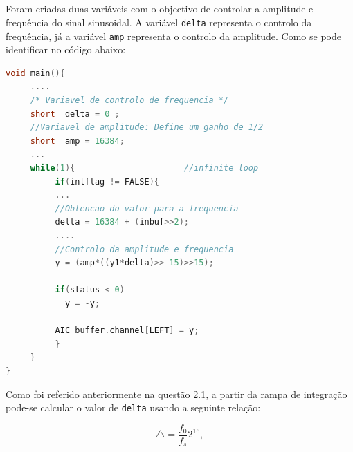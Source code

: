 \documentclass[11pt]{article}
\numberwithin{equation}{section}
\begin{document}

\subsection{} %


\subsection{} %


\subsection{} %


\subsection{} %

Foram criadas duas variáveis com o objectivo de controlar a amplitude e frequência do sinal sinusoidal. A variável \texttt{delta} representa o controlo da frequência, já a variável \texttt{amp} representa o controlo da amplitude. Como se pode identificar no código abaixo:  

\begin{lstlisting}[language=C]
void main(){
	 ....
	 /* Variavel de controlo de frequencia */
	 short 	delta = 0 ;
	 //Variavel de amplitude: Define um ganho de 1/2 
	 short	amp = 16384; 
	 ...
	 while(1){                	   	//infinite loop
		  if(intflag != FALSE){
		  ...	
		  //Obtencao do valor para a frequencia		
		  delta = 16384 + (inbuf>>2); 
		  ....
		  //Controlo da amplitude e frequencia
		  y = (amp*((y1*delta)>> 15)>>15);
		
		  if(status < 0)
			y = -y;
			
		  AIC_buffer.channel[LEFT] = y;
		  }
	 }
}
\end{lstlisting}

Como foi referido anteriormente na questão 2.1, a partir da rampa de integração pode-se calcular o valor de \texttt{delta} usando a seguinte relação:

\vspace{-3mm}
\begin{equation}
\bigtriangleup = \frac{f_{0}}{f_{s}} 2^{16},
\label{eq:freq_bin}
\end{equation}
\end{document}
